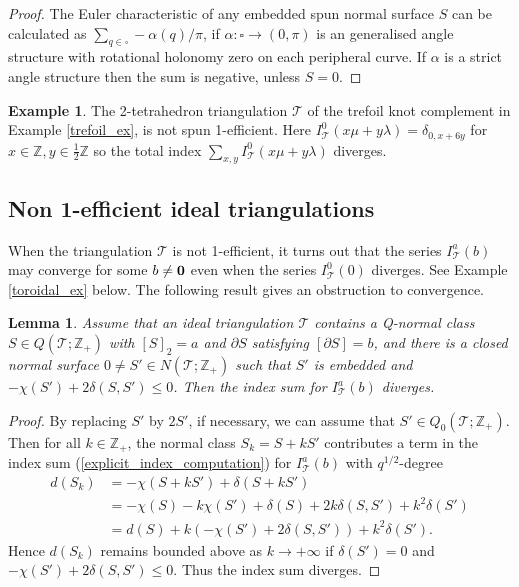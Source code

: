 \documentclass[12pt,reqno]{amsart}  %
\newtheorem{lemma}[thm]{Lemma}
\theoremstyle{definition}
\newtheorem{ex}[thm]{Example}
\theoremstyle{remark}
\newcommand{\T}{\mathcal{T}}
\def\Z{\mathbb Z}
\def\bd{\partial}
\def\quads{\square}  %
\begin{document}
\begin{proof}
The Euler characteristic of any embedded spun normal surface $S$ can be 
calculated as $\sum_{q \in \quads} -\alpha(q)/\pi$,  if 
$\alpha: \quads \to (0,\pi)$ is an generalised angle structure 
with rotational holonomy zero on each peripheral curve. If $\alpha$ is a 
strict angle structure then the sum is negative, unless $S=0$.
\end{proof}

\begin{ex}
The 2-tetrahedron triangulation $\T$ of the trefoil knot complement in 
Example \ref{trefoil_ex}, is not spun 1-efficient. Here 
$I^0_\T(x \mu + y \lambda) =  \delta_{0,x+6y}$ for 
$x \in \Z, y \in \frac{1}{2} \Z$ so the total index 
$\sum_{x,y} I^0_\T(x \mu + y \lambda)$ diverges.
\end{ex}

\subsection{Non 1-efficient ideal triangulations}

When the triangulation $\T$ is not 1-efficient, it turns out that the 
series $I_\T^a(b)$ may converge for some $b \ne {\bf 0}$
even when the series $I_\T^0(0)$ diverges.  See Example \ref{toroidal_ex} 
below. The following result gives an obstruction to convergence.

\begin{lemma} 
Assume that an ideal triangulation $\T$ contains a Q-normal class 
$S \in Q(\T;\Z_+)$ with $[S]_2=a$ and $\bd S$ satisfying $[\bd S]=b$,
and there is a closed normal surface $0 \ne S' \in N(\T;\Z_+)$ such that 
$S'$ is embedded and $-\chi(S')+ 2\delta(S,S') \le 0$.
Then the index sum for $I_\T^a(b)$ diverges.
\end{lemma}

\begin{proof}
By replacing $S'$ by $2 S'$, if necessary, we can assume that 
$S' \in Q_0(\T;\Z_+)$. Then for all $k \in \Z_+$, the normal class 
$S_k=S+k S'$ contributes a term in the index sum 
(\ref{explicit_index_computation}) for $I_\T^a(b)$ with $q^{1/2}$-degree 
\begin{align}
d (S_k) &= -\chi(S+k S') + \delta(S+k S') \nonumber \\
&= -\chi(S)-k\chi(S') +\delta(S)+2k \delta(S,S')+k^2\delta(S') \nonumber \\
& = d(S)+k\left( -\chi(S')+2 \delta(S,S')\right)+k^2\delta(S').
\label{degree_S_k}
\end{align}
Hence $d(S_k)$ remains bounded above as $k \to +\infty$ if $\delta(S')=0$ 
and $-\chi(S')+2 \delta(S,S')\le 0$. Thus the index sum diverges.
\end{proof}
\end{document}
